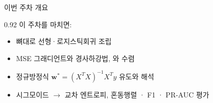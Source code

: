 \begin{frame}{이번 주차 개요}
\begin{center}\begin{varwidth}{0.92\textwidth}
  \small
  이 주차를 마치면:
  \begin{itemize}
    \item {} 뼈대로 선형·로지스틱회귀 조립
    \item MSE 그래디언트와 경사하강법, 와 수렴
    \item 정규방정식 $\boldsymbol{w}^{*} = (X^TX)^{-1}X^Ty$ 유도와  해석
    \item 시그모이드 $\to$ 교차 엔트로피, 혼동행렬 · F1 · PR-AUC 평가
  \end{itemize}
\end{varwidth}\end{center}
\end{frame}

